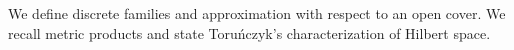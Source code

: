 We define discrete families and approximation with respect to an open cover.
We recall metric products and state Toru\'nczyk's characterization of Hilbert space.
